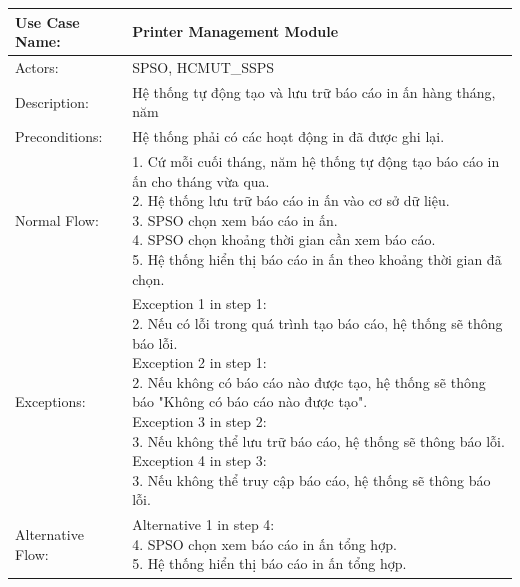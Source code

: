 \begin{table}[h!]
	\centering
	\begin{tabular}{ |p{4cm}|p{3cm}|p{3cm}|p{3cm}|  }
		\hline
		Use Case Name:    & \multicolumn{3}{l|}{Printer Management Module}                                           \\
		\hline
		Actors:           & \multicolumn{3}{p{10cm}|}{SPSO, HCMUT\_SSPS}                                             \\
		\hline
		Description:      & \multicolumn{3}{p{10cm}|}{Hệ thống tự động tạo và lưu trữ báo cáo in ấn hàng tháng, năm} \\
		\hline
		Preconditions:    & \multicolumn{3}{p{10cm}|}{Hệ thống phải có các hoạt động in đã được ghi lại.}            \\
		\hline
		Normal Flow:      & \multicolumn{3}{p{10cm}|}{
			1. Cứ mỗi cuối tháng, năm hệ thống tự động tạo báo cáo in ấn cho tháng vừa qua.\newline
			2. Hệ thống lưu trữ báo cáo in ấn vào cơ sở dữ liệu.\newline
			3. SPSO chọn xem báo cáo in ấn.\newline
			4. SPSO chọn khoảng thời gian cần xem báo cáo.\newline
			5. Hệ thống hiển thị báo cáo in ấn theo khoảng thời gian đã chọn.
		}                                                                                                            \\
		\hline
		Exceptions:       & \multicolumn{3}{p{10cm}|}{
			Exception 1 in step 1:\newline
			2. Nếu có lỗi trong quá trình tạo báo cáo, hệ thống sẽ thông báo lỗi.\newline
			Exception 2 in step 1:\newline
			2. Nếu không có báo cáo nào được tạo, hệ thống sẽ thông báo "Không có báo cáo nào được tạo".\newline
			Exception 3 in step 2:\newline
			3. Nếu không thể lưu trữ báo cáo, hệ thống sẽ thông báo lỗi.\newline
			Exception 4 in step 3:\newline
			3. Nếu không thể truy cập báo cáo, hệ thống sẽ thông báo lỗi.
		}                                                                                                            \\
		\hline
		Alternative Flow: & \multicolumn{3}{p{10cm}|}{
			Alternative 1 in step 4:\newline
			4. SPSO chọn xem báo cáo in ấn tổng hợp.\newline
			5. Hệ thống hiển thị báo cáo in ấn tổng hợp.
		}                                                                                                            \\
		\hline
	\end{tabular}
\end{table}
\newpage